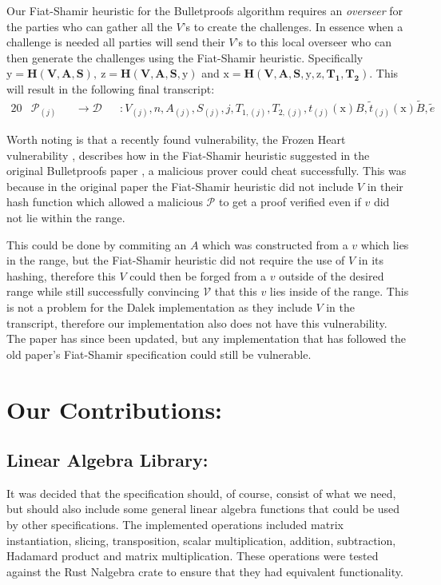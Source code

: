 \documentclass{article}
\newcommand{\eq}[1]{\begin{alignat*}{20}#1\end{alignat*}}
\renewcommand{\vec}[1]{\boldsymbol{#1}}
\newcommand{\ran}[1]{\mathrm{#1}}
\newcommand{\V}{\mathcal{V}}
\renewcommand{\P}{\mathcal{P}}
\newcommand{\D}{\mathcal{D}}
\newcommand{\blind}[1]{\widetilde{#1}}
\newcommand{\bt}{\blind{t}}
\newcommand{\bB}{\blind{B}}
\newcommand{\be}{\blind{e}}
\begin{document}
Our Fiat-Shamir heuristic for the Bulletproofs algorithm requires
an \textit{overseer} for the parties who can gather all the $V$'s
to create the challenges. In essence when a challenge is needed all
parties will send their $V$'s to this local overseer who can then
generate the challenges using the Fiat-Shamir heuristic. Specifically
$\ran{y} = \textbf{H}(\vec{V},\vec{A},\vec{S}), \ \ran{z} =
\textbf{H}(\vec{V},\vec{A},\vec{S}, \ran{y})$ and $\ran{x}
= \textbf{H}(\vec{V},\vec{A},\vec{S}, \ran{y}, \ran{z},
\vec{T_1},\vec{T_2})$. This will result in the following final
transcript:
\eq{
	&\P_{(j)} &&\rightarrow \D &&: V_{(j)}, n, A_{(j)}, S_{(j)}, j, T_{1, (j)}, T_{2,(j)}, t_{(j)}(\ran{x})B, \bt_{(j)}(\ran{x})\bB, \be
}

Worth noting is that a recently found vulnerability, the Frozen
Heart vulnerability \cite{frozen-heart}, describes how in the
Fiat-Shamir heuristic suggested in the original Bulletproofs paper
\cite{bulletproofs}, a malicious prover could cheat successfully. This
was because in the original paper the Fiat-Shamir heuristic did not
include $V$ in their hash function which allowed a malicious $\P$
to get a proof verified even if $v$ did not lie within the range.

This could be done by commiting an $A$ which was constructed from
a $v$ which lies in the range, but the Fiat-Shamir heuristic did
not require the use of $V$ in its hashing, therefore this $V$
could then be forged from a $v$ outside of the desired range while
still successfully convincing $\V$ that this $v$ lies inside of the
range. This is not a problem for the Dalek implementation as they
include $V$ in the transcript, therefore our implementation also
does not have this vulnerability. The paper has since been updated,
but any implementation that has followed the old paper's Fiat-Shamir
specification could still be vulnerable.

\section{Our Contributions:} \label{our-contributions}

\subsection{Linear Algebra Library:} \label{linear-algebra-library}
It was decided that the specification should, of course, consist of what
we need, but should also include some general linear algebra functions 
that could be used by other specifications. The implemented operations 
included matrix instantiation, slicing, transposition, scalar 
multiplication, addition, subtraction, Hadamard product and matrix 
multiplication. These operations were tested against the Rust Nalgebra 
crate \cite{nalgebra} to ensure that they had equivalent functionality.
\end{document}
